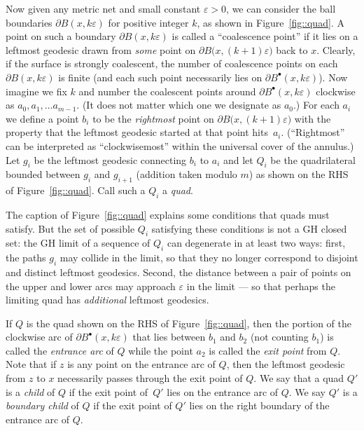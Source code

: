 \documentclass[JEP,XML,SOM,Unicode]{cedram}
\newcommand{\sbullet}{{\scriptscriptstyle\bullet}}
\let\epsilon\varepsilon
\theoremstyle{plain}
\numberwithin{theorem}{section}
\theoremstyle{definition}
\newcommand{\fb}[2]{B^\sbullet(#1,#2)}
\begin{document}
Now given any metric net and small constant $\epsilon>0$, we can consider the ball boundaries $\partial B(x,k\epsilon)$ for positive integer $k$, as shown in Figure~\ref{fig::quad}. A point on such a boundary $\partial B(x,k\epsilon)$ is called a ``coalescence point'' if it lies on a leftmost geodesic drawn from \emph{some} point on $\partial B\bigl(x,(k+1)\epsilon\bigr)$ back to $x$. Clearly, if the surface is strongly coalescent, the number of coalescence points on each $\partial B(x,k\epsilon)$ is finite (and each such point necessarily lies on $\partial \fb{x}{k\epsilon}$). Now imagine we fix $k$ and number the coalescent points around $\partial \fb{x}{k\epsilon}$ clockwise as $a_0, a_1, \ldots a_{m-1}$. (It does not matter which one we designate as $a_0$.) For each $a_i$ we define a point $b_i$ to be the \emph{rightmost} point on $\partial B\bigl(x,(k+1)\epsilon\bigr)$ with the property that the leftmost geodesic started at that point hits~$a_i$. (``Rightmost'' can be interpreted as ``clockwisemost'' within the universal cover of the annulus.) Let $g_i$ be the leftmost geodesic connecting $b_i$ to $a_i$ and let $Q_i$ be the quadrilateral bounded between $g_i$ and $g_{i+1}$ (addition taken modulo $m$) as shown on the RHS of Figure~\ref{fig::quad}. Call such a $Q_i$ a \emph{quad}.

The caption of Figure~\ref{fig::quad} explains some conditions that quads must satisfy. But the set of possible $Q_i$ satisfying these conditions is not a GH closed set: the GH limit of a sequence of $Q_i$ can degenerate in at least two ways: first, the paths $g_i$ may collide in the limit, so that they no longer correspond to disjoint and distinct leftmost geodesics. Second, the distance between a pair of points on the upper and lower arcs may approach $\epsilon$ in the limit --- so that perhaps the limiting quad has \emph{additional} leftmost geodesics.

If $Q$ is the quad shown on the RHS of Figure~\ref{fig::quad}, then the portion of the clockwise arc of $\partial \fb{x}{k\epsilon}$ that lies between $b_1$ and $b_2$ (not counting $b_1$) is called the \emph{entrance arc} of $Q$ while the point $a_2$ is called the \emph{exit point} from $Q$. Note that if $z$ is any point on the entrance arc of $Q$, then the leftmost geodesic from $z$ to $x$ necessarily passes through the exit point of $Q$. We say that a quad $Q'$ is a \emph{child} of $Q$ if the exit point of~$Q'$ lies on the entrance arc of $Q$. We say $Q'$ is a \emph{boundary child} of $Q$ if the exit point of $Q'$ lies on the right boundary of the entrance arc of $Q$.\enlargethispage{\baselineskip}%
\end{document}
